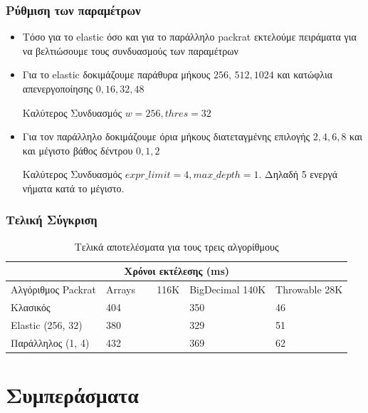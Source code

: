 \documentclass{beamer}
\begin{document}
\begin{frame}
  \frametitle{Ρύθμιση των παραμέτρων}
  \begin{itemize}
	\item Τόσο για το elastic όσο και για το παράλληλο packrat εκτελούμε πειράματα για να βελτιώσουμε τους συνδυασμούς των παραμέτρων \pause
	\item Για το elastic δοκιμάζουμε παράθυρα μήκους $256$, $512, 1024$ και κατώφλια απενεργοποίησης $0, 16, 32, 48$ \pause
	  \begin{block}{Καλύτερος Συνδυασμός}
		$w = 256, thres = 32$
	  \end{block} \pause
	\item Για τον παράλληλο δοκιμάζουμε όρια μήκους διατεταγμένης επιλογής $2, 4, 6, 8$ και και μέγιστο βάθος δέντρου $0, 1, 2$ \pause
	  \begin{block}{Καλύτερος Συνδυασμός}
		$expr\_limit = 4, max\_depth = 1$. Δηλαδή 5 ενεργά νήματα κατά το μέγιστο.
	  \end{block} 
  \end{itemize}
\end{frame}

\begin{frame}
  \frametitle{Τελική Σύγκριση}

\begin{table}[!ht]
\begin{tabular}{ |p{3cm}||p{2cm}|p{2cm}|p{2cm}|  }
 \hline
  \multicolumn{4}{|c|}{Χρόνοι εκτέλεσης (ms)} \\
 \hline
  Αλγόριθμος Packrat& Arrays ~~~  116K &BigDecimal 140K &Throwable 28K\\
 \hline
 Κλασικός & 404 & 350 & \cellcolor{green!45}46\\
  Elastic (256, 32) & \cellcolor{green!45}380 & \cellcolor{green!45}329 & 51\\
  Παράλληλος (1, 4) & 432 & 369 & 62\\
 \hline
\end{tabular}
  \caption{Τελικά αποτελέσματα για τους τρεις αλγορίθμους}
\end{table}

\end{frame}

\section{Συμπεράσματα}
\end{document}

